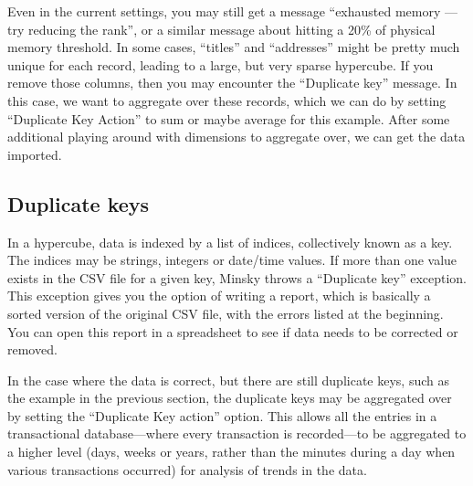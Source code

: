 Even in the current settings, you may still get a message ``exhausted
memory --- try reducing the rank'', or a similar message about hitting
a 20\% of physical memory threshold. In some cases, ``titles'' and
``addresses'' might be pretty much unique for each record, leading
to a large, but very sparse hypercube. If you remove those columns,
then you may encounter the ``Duplicate key'' message. In this case,
we want to aggregate over these records, which we can do by setting
``Duplicate Key Action'' to sum or maybe average for this example.
After some additional playing around with dimensions to aggregate
over, we can get the data imported.
\begin{center}
\par\end{center}

\subsection{Duplicate keys}

In a hypercube, data is indexed by a list of indices, collectively
known as a key. The indices may be strings, integers or date/time
values. If more than one value exists in the CSV file for a given
key, Minsky throws a ``Duplicate key'' exception. This exception
gives you the option of writing a report, which is basically a sorted
version of the original CSV file, with the errors listed at the beginning.
You can open this report in a spreadsheet to see if data needs to
be corrected or removed.

In the case where the data is correct, but there are still duplicate
keys, such as the example in the previous section, the duplicate keys
may be aggregated over by setting the ``Duplicate Key action'' option.
This allows all the entries in a transactional database---where every
transaction is recorded---to be aggregated to a higher level (days,
weeks or years, rather than the minutes during a day when various
transactions occurred) for analysis of trends in the data.

